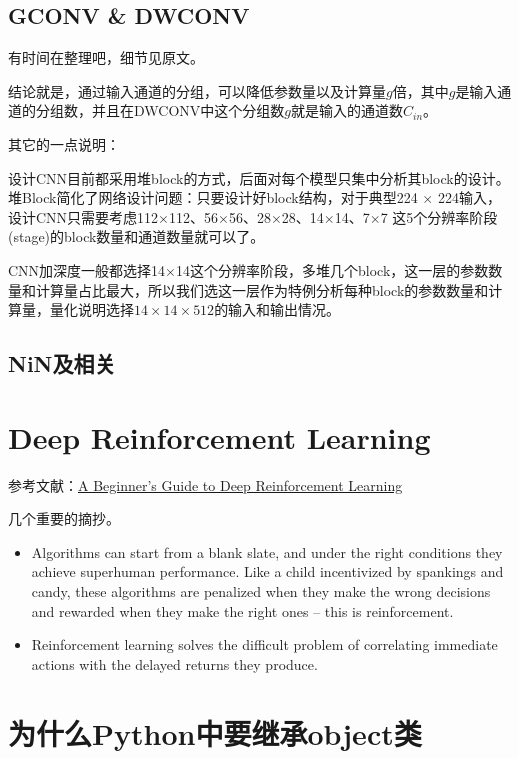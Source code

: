 \subsection{GCONV \& DWCONV}

有时间在整理吧，细节见原文。

结论就是，通过输入通道的分组，可以降低参数量以及计算量$g$倍，其中$g$是输入通道的分组数，并且在DWCONV中这个分组数$g$就是输入的通道数$C_{in}$。

其它的一点说明：

设计CNN目前都采用堆block的方式，后面对每个模型只集中分析其block的设计。堆Block简化了网络设计问题：只要设计好block结构，对于典型224 $\times$ 224输入，设计CNN只需要考虑112$\times$112、56$\times$56、28$\times$28、14$\times$14、7$\times$7 这5个分辨率阶段(stage)的block数量和通道数量就可以了。

CNN加深度一般都选择14$\times$14这个分辨率阶段，多堆几个block，这一层的参数数量和计算量占比最大，所以我们选这一层作为特例分析每种block的参数数量和计算量，量化说明选择$14\times14\times512$的输入和输出情况。

\subsection{NiN及相关}




\section{Deep Reinforcement Learning}

参考文献：\href{https://deeplearning4j.org/deepreinforcementlearning}{A Beginner's Guide to Deep Reinforcement Learning}

几个重要的摘抄。
\begin{itemize}
\item Algorithms can start from a blank slate, and under the right conditions they achieve superhuman performance. Like a child incentivized by spankings and candy, these algorithms are penalized when they make the wrong decisions and rewarded when they make the right ones – this is reinforcement.

\item Reinforcement learning solves the difficult problem of correlating immediate actions with the delayed returns they produce. 
\end{itemize}

\section{为什么Python中要继承object类}

